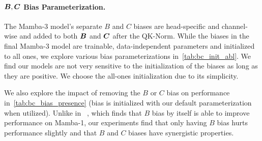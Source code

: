 \paragraph{${\bm{B}},{\bm{C}}$ Bias Parameterization.}
The Mamba-3 model's separate $B$ and $C$ biases are head-specific and channel-wise and added to both ${\bm{B}}$ and ${\bm{C}}$ after the QK-Norm. While the biases in the final Mamba-3 model are trainable, data-independent parameters and initialized to all ones, we explore various bias parameterizations in~\cref{tab:bc_init_abl}. We find our models are not very sensitive to the initialization of the biases as long as they are positive. We choose the all-ones initialization due to its simplicity.

We also explore the impact of removing the $B$ or $C$ bias on performance in~\cref{tab:bc_bias_presence} (bias is initialized with our default parameterization when utilized). Unlike in ~\citet{yu2025blockbiasedmamba}, which finds that $B$ bias by itself is able to improve performance on Mamba-1, our experiments find that only having $B$ bias hurts performance slightly and that $B$ and $C$ biases have synergistic properties.

